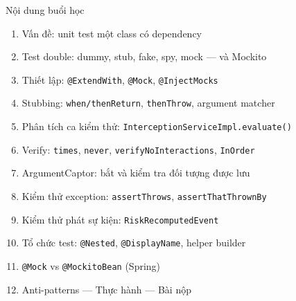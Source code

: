 \documentclass[aspectratio=169,12pt]{beamer}
\begin{document}
\begin{frame}{Nội dung buổi học}
  \begin{enumerate}\small
    \item Vấn đề: unit test một class có dependency
    \item Test double: dummy, stub, fake, spy, mock --- và Mockito
    \item Thiết lập: \texttt{@ExtendWith}, \texttt{@Mock}, \texttt{@InjectMocks}
    \item Stubbing: \texttt{when/thenReturn}, \texttt{thenThrow}, argument matcher
    \item Phân tích ca kiểm thử: \texttt{InterceptionServiceImpl.evaluate()}
    \item Verify: \texttt{times}, \texttt{never}, \texttt{verifyNoInteractions}, \texttt{InOrder}
    \item ArgumentCaptor: bắt và kiểm tra đối tượng được lưu
    \item Kiểm thử exception: \texttt{assertThrows}, \texttt{assertThatThrownBy}
    \item Kiểm thử phát sự kiện: \texttt{RiskRecomputedEvent}
    \item Tổ chức test: \texttt{@Nested}, \texttt{@DisplayName}, helper builder
    \item \texttt{@Mock} vs \texttt{@MockitoBean} (Spring)
    \item Anti-patterns --- Thực hành --- Bài nộp
  \end{enumerate}
\end{frame}
\end{document}
